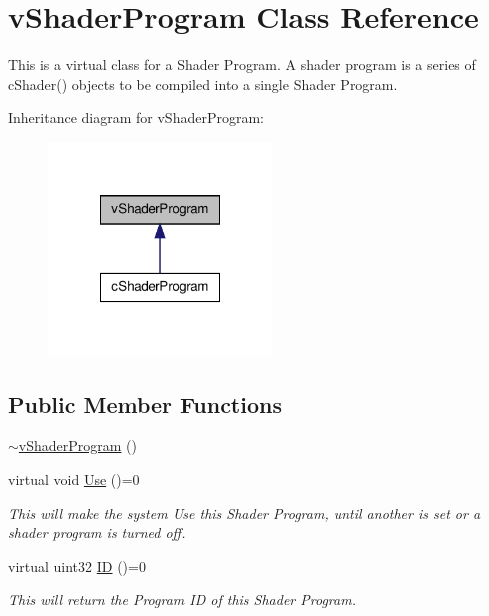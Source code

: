 \hypertarget{classv_shader_program}{
\section{vShaderProgram Class Reference}
\label{classv_shader_program}
}


This is a virtual class for a Shader Program. A shader program is a series of cShader() objects to be compiled into a single Shader Program.  




Inheritance diagram for vShaderProgram:
\nopagebreak
\begin{figure}[H]
\begin{center}
\leavevmode
\includegraphics[width=168pt]{classv_shader_program__inherit__graph}
\end{center}
\end{figure}
\subsection*{Public Member Functions}
\begin{DoxyCompactItemize}
\item 
\hyperlink{classv_shader_program_a27a3610d63fff544ca028d79830d9538}{$\sim$vShaderProgram} ()
\item 
virtual void \hyperlink{classv_shader_program_a9772ed9e4d99d064e6bf4cd59207c361}{Use} ()=0
\begin{DoxyCompactList}\small\item\em This will make the system Use this Shader Program, until another is set or a shader program is turned off. \item\end{DoxyCompactList}\item 
virtual uint32 \hyperlink{classv_shader_program_a707a85109ebb61f0fc7bb1aa36a0d8bc}{ID} ()=0
\begin{DoxyCompactList}\small\item\em This will return the Program ID of this Shader Program. \item\end{DoxyCompactList}\end{DoxyCompactItemize}



